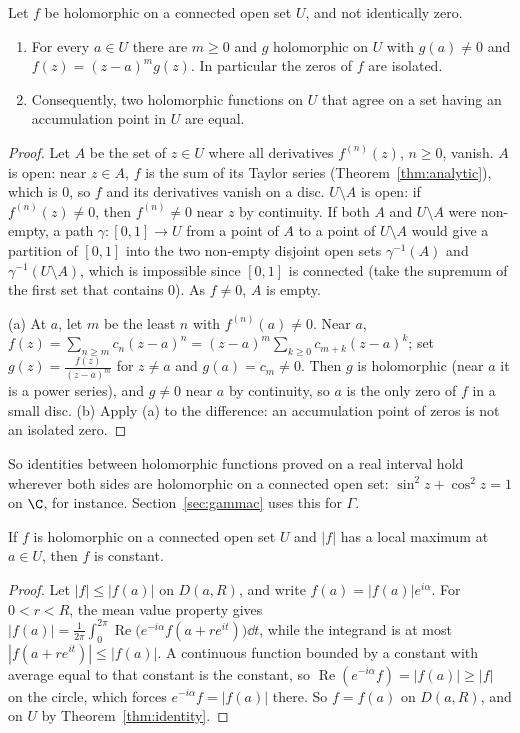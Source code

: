 \begin{theorem}\label{thm:identity}
Let $f$ be holomorphic on a connected open set $U$, and not identically zero.
\begin{enumerate}[label=(\alph*)]
\item For every $a\in U$ there are $m\ge0$ and $g$ holomorphic on $U$ with $g(a)\ne0$ and $f(z)=(z-a)^mg(z)$. In particular the zeros of $f$ are isolated.
\item Consequently, two holomorphic functions on $U$ that agree on a set having an accumulation point in $U$ are equal.
\end{enumerate}
\end{theorem}
\begin{proof}
Let $A$ be the set of $z\in U$ where all derivatives $f^{(n)}(z)$, $n\ge0$, vanish. $A$ is open: near $z\in A$, $f$ is the sum of its Taylor series
(Theorem~\ref{thm:analytic}), which is $0$, so $f$ and its derivatives vanish on a disc. $U\setminus A$ is open: if $f^{(n)}(z)\ne0$, then $f^{(n)}\ne0$ near $z$ by
continuity. If both $A$ and $U\setminus A$ were non-empty, a path $\gamma:[0,1]\to U$ from a point of $A$ to a point of $U\setminus A$ would give a partition of $[0,1]$
into the two non-empty disjoint open sets $\gamma^{-1}(A)$ and $\gamma^{-1}(U\setminus A)$, which is impossible since $[0,1]$ is connected (take the supremum of the
first set that contains $0$). As $f\ne0$, $A$ is empty.

(a) At $a$, let $m$ be the least $n$ with $f^{(n)}(a)\ne0$. Near $a$, $f(z)=\sum_{n\ge m}c_n(z-a)^n=(z-a)^m\sum_{k\ge0}c_{m+k}(z-a)^k$; set
$g(z)=\frac{f(z)}{(z-a)^m}$ for $z\ne a$ and $g(a)=c_m\ne0$. Then $g$ is holomorphic (near $a$ it is a power series), and $g\ne0$ near $a$ by continuity,
so $a$ is the only zero of $f$ in a small disc. (b) Apply (a) to the difference: an accumulation point of zeros is not an isolated zero.
\end{proof}

So identities between holomorphic functions proved on a real interval hold wherever both sides are holomorphic on a
connected open set: $\sin^2z+\cos^2z=1$ on $\C$, for instance. Section~\ref{sec:gammac} uses this for $\Gamma$.

\begin{theorem}\label{thm:maxprinciple}
If $f$ is holomorphic on a connected open set $U$ and $|f|$ has a local maximum at $a\in U$, then $f$ is constant.
\end{theorem}
\begin{proof}
Let $|f|\le|f(a)|$ on $D(a,R)$, and write $f(a)=|f(a)|e^{i\alpha}$. For $0<r<R$, the mean value property gives
$|f(a)|=\frac1{2\pi}\int_0^{2\pi}\operatorname{Re}\bigl(e^{-i\alpha}f(a+re^{it})\bigr)\dd t$, while the integrand is at most $|f(a+re^{it})|\le|f(a)|$. A continuous function
bounded by a constant with average equal to that constant is the constant, so $\operatorname{Re}(e^{-i\alpha}f)=|f(a)|\ge|f|$ on the circle, which forces
$e^{-i\alpha}f=|f(a)|$ there. So $f=f(a)$ on $D(a,R)$, and on $U$ by Theorem~\ref{thm:identity}.
\end{proof}

